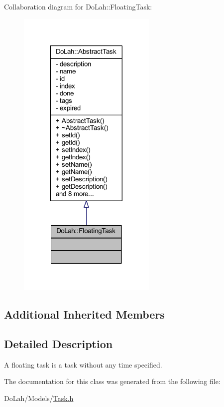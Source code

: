 Collaboration diagram for Do\+Lah\+:\+:Floating\+Task\+:\nopagebreak
\begin{figure}[H]
\begin{center}
\leavevmode
\includegraphics[width=188pt]{class_do_lah_1_1_floating_task__coll__graph}
\end{center}
\end{figure}
\subsection*{Additional Inherited Members}


\subsection{Detailed Description}
A floating task is a task without any time specified. 

The documentation for this class was generated from the following file\+:\begin{DoxyCompactItemize}
\item 
Do\+Lah/\+Models/\hyperlink{_task_8h}{Task.\+h}\end{DoxyCompactItemize}
